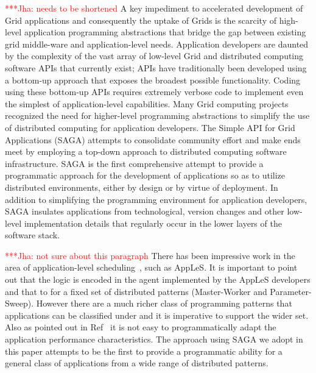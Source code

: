 \documentclass[conference,final]{IEEEtran}
\newcommand{\jhanote}[1]{ {\textcolor{red} { ***Jha: #1 }}}
\begin{document}
\jhanote{needs to be shortened} A key impediment to accelerated
development of Grid applications and consequently the uptake of Grids
is the scarcity of high-level application programming abstractions
that bridge the gap between existing grid middle-ware and
application-level needs.  Application developers are daunted by the
complexity of the vast array of low-level Grid and distributed
computing software APIs that currently exist; APIs have traditionally
been developed using a bottom-up approach that exposes the broadest
possible functionality.  Coding using these bottom-up APIs requires
extremely verbose code to implement even the simplest of
application-level capabilities.  Many Grid computing
projects~\cite{gat, cog, realitygrid} recognized the need for
higher-level programming abstractions to simplify the use of
distributed computing for application developers.  The Simple API for
Grid Applications (SAGA) attempts to consolidate community effort and
make ends meet by employing a top-down approach to distributed
computing software infrastructure.  SAGA is the first comprehensive
attempt to provide a programmatic approach for the development of
applications so as to utilize distributed environments, either by
design or by virtue of deployment.  In addition to simplifying the
programming environment for application developers, SAGA insulates
applications from technological, version changes and other low-level
implementation details that regularly occur in the lower layers of the
software stack.


\jhanote{not sure about this paragraph} There has been impressive work
in the area of application-level scheduling~\cite{apples03}, such as
AppLeS. It is important to point out that the logic is encoded in the
agent implemented by the AppLeS developers and that to for a fixed set
of distributed patterns (Master-Worker and Parameter-Sweep).  However
there are a much richer class of programming patterns that
applications can be classified under and it is imperative to support
the wider set. Also as pointed out in Ref~\cite{apples03} it is not
easy to programmatically adapt the application performance
characteristics. The approach using SAGA we adopt in this paper
attempts to be the first to provide a programmatic ability for a
general class of applications from a wide range of distributed
patterns.
\end{document}
